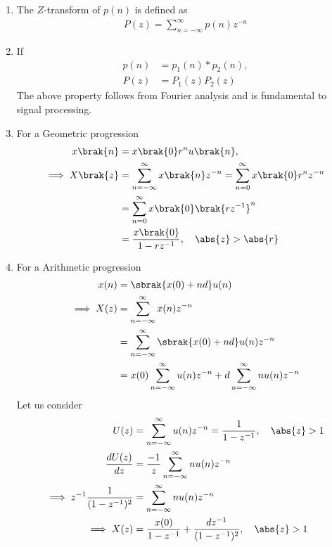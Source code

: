 \begin{enumerate}[label=\thechapter.\arabic*,ref=\thechapter.\theenumi]
\item 
	The $Z$-transform of $p(n)$ is defined as
\begin{align}
P(z) = \sum_{n=-\infty}^{\infty}p(n)z^{-n}
\label{eq:ztrans}
\end{align}
\item If 
\begin{align}
	p(n) &= p_1(n)* p_2(n),
	\\
	P(z)&=P_1(z)P_2(z)
\end{align}
The above property follows from Fourier analysis and is fundamental to signal processing. 
\item For a Geometric progression 
\begin{align}
	x\brak{n} &=x\brak{0}r^nu\brak{n},
	\\
         \implies      X\brak{z} &= \sum_{n=-\infty}^{\infty}x\brak{n}z^{-n}
               =\sum_{n=0}^{\infty}x\brak{0}r^nz^{-n}\\
                &=\sum_{n=0}^{\infty}x\brak{0}\brak{rz^{-1}}^n\\
               &= \frac{x\brak{0}}{1-rz^{-1}}, \quad \abs{z}>\abs{r} 
\end{align}
\item For a Arithmetic progression
\begin{align}
	x(n) &= \sbrak{x(0) + nd} u(n)\\
	\implies X(z) &= \sum_{n = -\infty}^{\infty} x(n) z^{-n}\\ 
	&= \sum_{n = -\infty}^{\infty} \sbrak{x(0) + nd}u(n)z^{-n}\\
	&= x(0) \sum_{n = -\infty}^{\infty} u(n)z^{-n} + d \sum_{n = -\infty}^{\infty} nu(n)z^{-n}
\end{align}
Let us consider
\begin{align}
	U(z) &= \sum_{n = -\infty}^{\infty} u(n) z^{-n} = \frac{1}{1-z^{-1}}, \quad \abs{z} > 1 \\
	\frac{dU(z)}{dz} &= \frac{-1}{z} \sum_{n = -\infty}^{\infty} nu(n) z^{-n}\\
	\implies z^{-1}\frac{1}{(1-z^{-1})^{2}} &= \sum_{n = -\infty}^{\infty} nu(n) z^{-n}\\
	\implies X(z) &= \frac{x(0)}{1-z^{-1}} + \frac{dz^{-1}}{(1-z^{-1})^{2}}, \quad \abs{z} > 1 
\end{align}
\end{enumerate}
